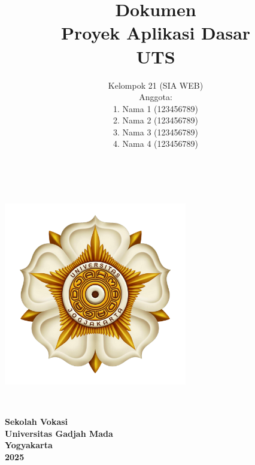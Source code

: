 \documentclass[a4paper,oneside,11pt]{book}
\title{Dokumen \\ Proyek Aplikasi Dasar\\
UTS}
\author{Kelompok 21 (SIA WEB)\\
Anggota: \\
1. Nama 1 (123456789)\\
2. Nama 2 (123456789)\\
3. Nama 3 (123456789)\\
4. Nama 4 (123456789)}
\begin{document}
\begin{titlingpage} 
\begin{center}

\vspace{4cm} 
\begin{Large} 
\textbf{\thetitle} \\
\end{Large}
\vspace{2cm}

\includegraphics[height=8cm]{lambang ugm.png}\\ 
\begin{large}
\vspace{2cm} 
\theauthor\\ 
\end{large}

\vspace{2cm}
\begin{Large}
\textbf{Sekolah Vokasi}\\
\textbf{Universitas Gadjah Mada}\\
\textbf{Yogyakarta}\\
\textbf{2025}\\
\end{Large}

\end{center}
\end{titlingpage}

\pagestyle{fancy}
\fancyhf{}            %
\fancyfoot[C]{\thepage} %


\renewcommand{\cfttoctitlefont}{\hfill\normalfont\LARGE\bfseries}
\renewcommand{\cftaftertoctitle}{\hfill}
\renewcommand{\cftbeforetoctitleskip}{1em}
\renewcommand{\cftaftertoctitleskip}{1.5em}
\end{document}
